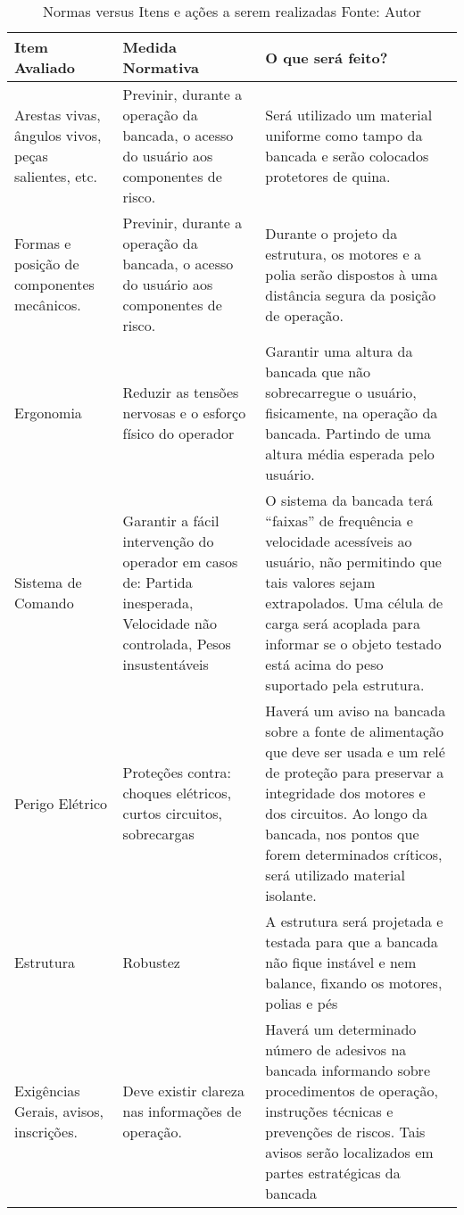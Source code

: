  \begin{table}[!ht]
            \begin{center}
              \begin{tabular}{|p{5cm}|p{5cm}|p{5cm}|}
                \hline
                \textbf{Item Avaliado} & \textbf{Medida Normativa} & \textbf{O que será feito?}
                \\ \hline
                Arestas vivas, ângulos vivos, peças salientes, etc. & Previnir, durante a operação da bancada, o acesso do usuário aos componentes de risco. & Será utilizado um material uniforme como tampo da bancada e serão colocados protetores de quina.
                \\ \hline
                Formas e posição de componentes mecânicos. & Previnir, durante a operação da bancada, o acesso do usuário aos componentes de risco. & Durante o projeto da estrutura, os motores e a polia serão dispostos à uma distância segura da posição de operação.
                \\ \hline
                Ergonomia & Reduzir as tensões nervosas e o esforço físico do operador & Garantir uma altura da bancada que não sobrecarregue o usuário, fisicamente, na operação da bancada. Partindo de uma altura média esperada pelo usuário.
                \\ \hline
                Sistema de Comando & Garantir a fácil intervenção do operador em casos de: Partida inesperada, Velocidade não controlada, Pesos insustentáveis & O sistema da bancada terá “faixas” de frequência e velocidade acessíveis ao usuário, não permitindo que tais valores sejam extrapolados. Uma célula de carga será acoplada para informar se o objeto testado está acima do peso suportado pela estrutura.
                \\ \hline
                Perigo Elétrico & Proteções contra: choques elétricos, curtos circuitos, sobrecargas & Haverá um aviso na bancada sobre a fonte de alimentação que deve ser usada e um relé de proteção para preservar a integridade dos motores e dos circuitos. Ao longo da bancada, nos pontos que forem determinados críticos, será utilizado material isolante.
                \\ \hline
                Estrutura & Robustez & A estrutura será projetada e testada para que a bancada não fique instável e nem balance, fixando os motores, polias e pés
                \\ \hline
                Exigências Gerais, avisos, inscrições. & Deve existir clareza nas informações de operação. & Haverá um determinado número de adesivos na bancada informando sobre procedimentos de operação, instruções técnicas e prevenções de riscos. Tais avisos serão localizados em partes estratégicas da bancada
                \\ \hline
              \end{tabular}
              \caption[Normas versus Itens e ações a serem realizadas]{Normas versus Itens e ações a serem realizadas
              \protect Fonte: Autor}
            \label{tabela_normas_1}
        \end{center}
    \end{table}

